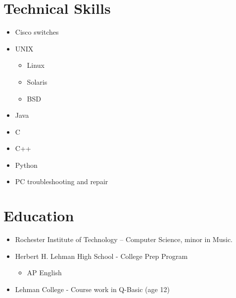\documentclass[margins]{res-compat}
\begin{document}
 


\address{{\bf School Address} \\ Rochester Institute of Technology \\ Computer
Science \\ 39 Nathaniel Rochester Hall \\ Rochester, NY 14623}
\address{{\bf Permanent Address} \\ 2710 Avenue J N/W \\ Winter Haven, FL
33881 \\ (863) 514-7014 \\ russ@eatnumber1.com}
 
\begin{resume} 

\section{Technical Skills}
	\begin{itemize} \itemsep -2pt
		\item Cisco switches
		\item UNIX
		\begin{itemize} \itemsep -2pt
			\item Linux
			\item Solaris
			\item BSD
		\end{itemize}
		\item Java
		\item C
		\item C++
		\item Python
		\item PC troubleshooting and repair
	 \end{itemize}

\section{Education}
	\begin{itemize} \itemsep -2pt
		\item Rochester Institute of Technology – Computer Science, minor in Music.
		\item Herbert H. Lehman High School - College Prep Program
		\begin{itemize} \itemsep -2pt
			\item AP English
		\end{itemize}
		\item Lehman College - Course work in Q-Basic (age 12)
	\end{itemize}


\end{resume}
\end{document}
